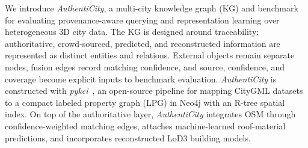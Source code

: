 \documentclass[sigconf,authordraft]{acmart}
\newcommand{\mytoolname}{\textit{pykci}}
\newcommand{\benchname}{\textit{Authenti\-City}}
\begin{document}
We introduce \benchname{}, a multi-city knowledge graph (KG) and benchmark for evaluating provenance-aware querying and representation learning over heterogeneous 3D city data. The KG is designed around traceability: authoritative, crowd-sourced, predicted, and reconstructed information are represented as distinct entities and relations. External objects remain separate nodes, fusion edges record matching confidence, and source, confidence, and coverage become explicit inputs to benchmark evaluation.
%
\benchname{} is constructed with \mytoolname{}~\cite{nguyen_pykci_2026}, an open-source pipeline for mapping CityGML datasets to a compact labeled property graph (LPG) in Neo4j with an R-tree spatial index. On top of the authoritative layer, \benchname{} integrates OSM through confidence-weighted matching edges, attaches machine-learned roof-material predictions, and incorporates reconstructed LoD3 building models.
\end{document}
